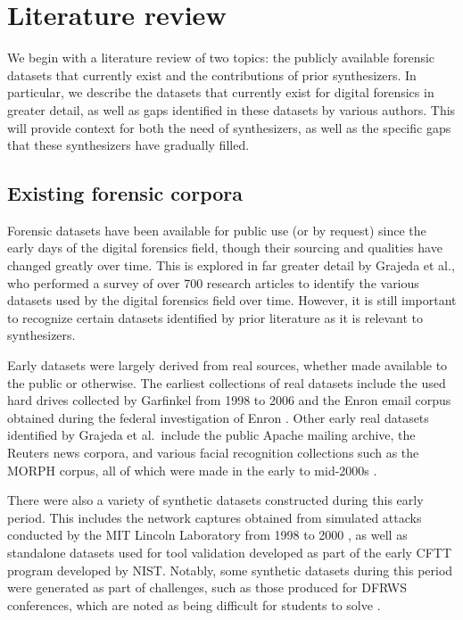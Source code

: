 \documentclass[letterpaper,12pt]{report}
\begin{document}
\chapter{Literature review}\label{chapter-two}

We begin with a literature review of two topics: the publicly available
forensic datasets that currently exist and the contributions of prior
synthesizers. In particular, we describe the datasets that currently
exist for digital forensics in greater detail, as well as gaps
identified in these datasets by various authors. This will provide
context for both the need of synthesizers, as well as the specific gaps
that these synthesizers have gradually filled.

\section{Existing forensic
corpora}\label{existing-forensic-corpora}

Forensic datasets have been available for public use (or by request)
since the early days of the digital forensics field, though their
sourcing and qualities have changed greatly over time. This is explored
in far greater detail by Grajeda et al., who performed a survey of over
700 research articles to identify the various datasets used by the
digital forensics field over time. However, it is still important to
recognize certain datasets identified by prior literature as it is
relevant to synthesizers.

Early datasets were largely derived from real sources, whether made
available to the public or otherwise. The earliest collections of real
datasets include the used hard drives collected by Garfinkel from 1998
to 2006 and the Enron email corpus obtained during the federal
investigation of Enron \cite{garfinkelForensicCorporaChallenge2007}.
Other early real datasets identified by Grajeda et al.~include the
public Apache mailing archive, the Reuters news corpora, and various
facial recognition collections such as the MORPH corpus, all of which
were made in the early to mid-2000s
\cite{yannikosDataCorporaDigital2014,grajedaAvailabilityDatasetsDigital2017}.

There were also a variety of synthetic datasets constructed during this
early period. This includes the network captures obtained from simulated
attacks conducted by the MIT Lincoln Laboratory from 1998 to 2000
\cite{garfinkelForensicCorporaChallenge2007}, as well as standalone
datasets used for tool validation developed as part of the early CFTT
program developed by NIST. Notably, some synthetic datasets during this
period were generated as part of challenges, such as those produced for
DFRWS conferences, which are noted as being difficult for students to
solve \cite{woodsCreatingRealisticCorpora2011}.
\end{document}
